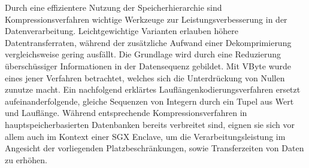 Durch eine effizientere Nutzung der Speicherhierarchie sind Kompressionsverfahren wichtige Werkzeuge zur Leistungsverbesserung in der Datenverarbeitung. Leichtgewichtige Varianten erlauben höhere Datentransferraten, während der zusätzliche Aufwand einer Dekomprimierung vergleichsweise gering ausfällt. Die Grundlage wird durch eine Reduzierung überschüssiger Informationen in der Datensequenz gebildet. Mit VByte wurde eines jener Verfahren betrachtet, welches sich die Unterdrückung von Nullen zunutze macht. Ein nachfolgend erklärtes Lauflängenkodierungsverfahren ersetzt aufeinanderfolgende, gleiche Sequenzen von Integern durch ein Tupel aus Wert und Lauflänge. Während entsprechende Kompressionsverfahren in hauptspeicherbasierten Datenbanken bereits verbreitet sind, eignen sie sich vor allem auch im Kontext einer \ac{SGX} Enclave, um die Verarbeitungsleistung im Angesicht der vorliegenden Platzbeschränkungen, sowie Transferzeiten von Daten zu erhöhen.